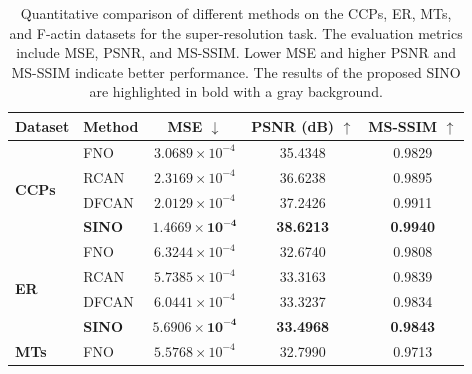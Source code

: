\documentclass[preprint,numbers,sort&compress]{elsarticle}
\begin{document}
			
			{  \begin{table}[t]
					\centering
					\caption{
						Quantitative comparison of different methods on the CCPs, ER, MTs, 
						and F-actin datasets for the super-resolution task.
						The evaluation metrics include MSE, PSNR, and MS-SSIM.
						Lower MSE and higher PSNR and MS-SSIM indicate better performance.
						The results of the proposed SINO are highlighted in bold with a gray background.
					}
					\label{tab:quantitative_comparison_biosr}
					\setlength{\tabcolsep}{10pt}
					\renewcommand{\arraystretch}{1.15}
					\begin{tabular}{llccc}
						\toprule
						\textbf{Dataset} 
						& \textbf{Method}
						& \textbf{MSE} $\downarrow$
						& \textbf{PSNR (dB)} $\uparrow$
						& \textbf{MS-SSIM} $\uparrow$ \\
						\midrule
						
						\multirow{4}{*}{\textbf{CCPs}}
						& FNO    
						& $3.0689\times10^{-4}$ 
						& 35.4348 
						& 0.9829 \\
						
						& RCAN   
						& $2.3169\times10^{-4}$ 
						& 36.6238 
						& 0.9895 \\
						
						
						& DFCAN  
						& $2.0129\times10^{-4}$ 
						& 37.2426 
						& 0.9911 \\
						
						\rowcolor{gray!18}
						& \textbf{SINO} 
						& $\mathbf{1.4669\times10^{-4}}$ 
						& \textbf{38.6213} 
						& \textbf{0.9940} \\
						
						\midrule
						
						\multirow{4}{*}{\textbf{ER}}
						& FNO    
						& $6.3244\times10^{-4}$ 
						& 32.6740 
						& 0.9808 \\
						
						& RCAN   
						& $5.7385\times10^{-4}$ 
						& 33.3163 
						& 0.9839 \\
						
						& DFCAN  
						& $6.0441\times10^{-4}$ 
						& 33.3237 
						& 0.9834 \\
						
						\rowcolor{gray!18}
						& \textbf{SINO} 
						& $\mathbf{5.6906\times10^{-4}}$ 
						& \textbf{33.4968} 
						& \textbf{0.9843} \\
						
						\midrule
						
						\multirow{4}{*}{\textbf{MTs}}
						& FNO    
						& $5.5768\times10^{-4}$ 
						& 32.7990 
						& 0.9713 \\
						

\end{tabular}
\end{table}}
\end{document}
